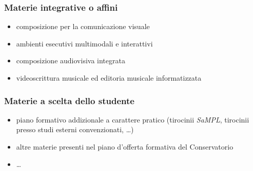 \begin{frame}
  \frametitle<+->{Materie integrative o affini}

	\begin{itemize}

    \item composizione per la comunicazione visuale

    \item ambienti esecutivi multimodali e interattivi

    \item composizione audiovisiva integrata

    \item videoscrittura musicale ed editoria musicale informatizzata

	\end{itemize}

\end{frame}

\begin{frame}
  \frametitle<+->{Materie a scelta dello studente}

	\begin{itemize}

    \item piano formativo addizionale a carattere pratico (tirocinii \emph{SaMPL},
    tirocinii presso studi esterni convenzionati, \ldots)

    \item altre materie presenti nel piano d'offerta formativa del Conservatorio

    \item \ldots

	\end{itemize}

\end{frame}

